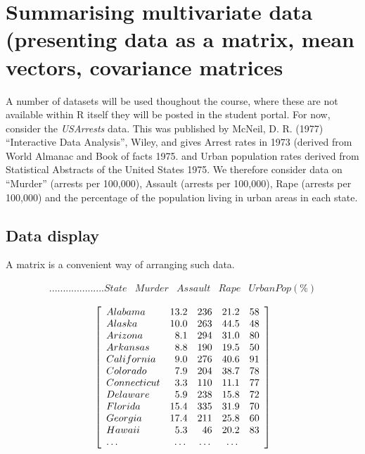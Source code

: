 
\section{Summarising multivariate data (presenting data as a matrix, mean vectors, covariance matrices}
\label{summary}


A number of datasets will be used thoughout the course, where these are not available within R itself they will be posted in the student portal.  For now, consider the \emph{USArrests} data.  This was published by McNeil, D. R. (1977) ``Interactive Data Analysis'', Wiley, and gives Arrest rates in 1973 (derived from World Almanac and Book of facts 1975.  and Urban population rates derived from Statistical Abstracts of the United States 1975.  We therefore consider data on  ``Murder'' (arrests per 100,000), Assault (arrests per 100,000), Rape (arrests per 100,000) and the percentage of the population living in urban areas in each state. 

\subsection{Data display}

A matrix is a convenient way of arranging such data.

\singlespacing
\begin{displaymath}
\begin{array}{lcccc}
....................State & Murder & Assault & Rape &  UrbanPop(\%)\\
\end{array}
\end{displaymath}
\begin{displaymath}
\left[ \begin{array}{lrrrr}
Alabama       &   13.2  &   236  &     21.2 &  58\\
Alaska         &  10.0   &  263  &    44.5 & 48\\
Arizona        &   8.1  &   294   &    31.0 &  80\\
Arkansas     &     8.8 &    190  &     19.5 &  50\\
California    &    9.0  &   276  &     40.6 & 91\\
Colorado       &   7.9  &   204  &     38.7 & 78\\
Connecticut   &    3.3  &   110    &   11.1 & 77\\
Delaware      &    5.9  &   238  &     15.8 & 72\\
Florida       &   15.4  &   335   &    31.9 & 70\\
Georgia     &     17.4  &   211    &   25.8 & 60\\
Hawaii       &     5.3  &    46    &   20.2 & 83\\
$\ldots$ & $\ldots$ & $\ldots$ & $\ldots$ \\
\end{array}
\right]
\end{displaymath}
\onehalfspacing

